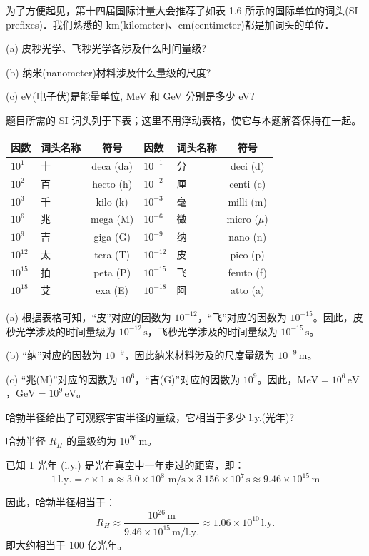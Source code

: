 \begin{exercise}\label{ex:1.1}
为了方便起见，第十四届国际计量大会推荐了如表 1.6 所示的国际单位的词头(SI prefixes)．我们熟悉的 km(kilometer)、cm(centimeter)都是加词头的单位．

(a) 皮秒光学、飞秒光学各涉及什么时间量级?

(b) 纳米(nanometer)材料涉及什么量级的尺度?

(c) eV(电子伏)是能量单位, MeV 和 GeV 分别是多少 eV?
\end{exercise}
\begin{solution}
题目所需的 SI 词头列于下表；这里不用浮动表格，使它与本题解答保持在一起。
\begin{center}
\small
\begin{tabular}{llc|llc}
\hline
因数 & 词头名称 & 符号 & 因数 & 词头名称 & 符号 \\
\hline
$10^1$ & 十 & deca (da) & $10^{-1}$ & 分 & deci (d) \\
$10^2$ & 百 & hecto (h) & $10^{-2}$ & 厘 & centi (c) \\
$10^3$ & 千 & kilo (k) & $10^{-3}$ & 毫 & milli (m) \\
$10^6$ & 兆 & mega (M) & $10^{-6}$ & 微 & micro ($\mu$) \\
$10^9$ & 吉 & giga (G) & $10^{-9}$ & 纳 & nano (n) \\
$10^{12}$ & 太 & tera (T) & $10^{-12}$ & 皮 & pico (p) \\
$10^{15}$ & 拍 & peta (P) & $10^{-15}$ & 飞 & femto (f) \\
$10^{18}$ & 艾 & exa (E) & $10^{-18}$ & 阿 & atto (a) \\
\hline
\end{tabular}
\end{center}

(a) 根据表格可知，“皮”对应的因数为 $10^{-12}$，“飞”对应的因数为 $10^{-15}$。因此，皮秒光学涉及的时间量级为 $10^{-12}\,\mathrm{s}$，飞秒光学涉及的时间量级为 $10^{-15}\,\mathrm{s}$。

(b) “纳”对应的因数为 $10^{-9}$，因此纳米材料涉及的尺度量级为 $10^{-9}\,\mathrm{m}$。

(c) “兆(M)”对应的因数为 $10^6$，“吉(G)”对应的因数为 $10^9$。因此，$\mathrm{MeV} = 10^6\,\mathrm{eV}$，$\mathrm{GeV} = 10^9\,\mathrm{eV}$。
\end{solution}

\begin{exercise}\label{ex:1.2}
哈勃半径给出了可观察宇宙半径的量级，它相当于多少 l.y.(光年)?
\end{exercise}
\begin{solution}
哈勃半径 $R_H$ 的量级约为 $10^{26}\,\mathrm{m}$。

已知 1 光年 (l.y.) 是光在真空中一年走过的距离，即：
$$ 1\,\mathrm{l.y.} = c \times 1\text{ a} \approx 3.0 \times 10^8\text{ m/s} \times 3.156 \times 10^7\,\mathrm{s} \approx 9.46 \times 10^{15}\,\mathrm{m} $$

因此，哈勃半径相当于：
$$ R_H \approx \frac{10^{26}\,\mathrm{m}}{9.46 \times 10^{15}\,\mathrm{m/l.y.}} \approx 1.06 \times 10^{10}\,\mathrm{l.y.} $$
即大约相当于 100 亿光年。
\end{solution}

